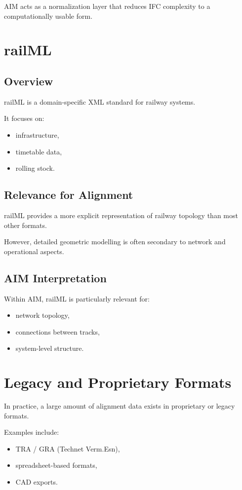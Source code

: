 AIM acts as a normalization layer that reduces IFC complexity to a
computationally usable form.


\section{railML}

\subsection{Overview}

railML is a domain-specific XML standard for railway systems.

It focuses on:
\begin{itemize}
\item infrastructure,
\item timetable data,
\item rolling stock.
\end{itemize}

\subsection{Relevance for Alignment}

railML provides a more explicit representation of railway topology than
most other formats.

However, detailed geometric modelling is often secondary to network and
operational aspects.

\subsection{AIM Interpretation}

Within AIM, railML is particularly relevant for:
\begin{itemize}
\item network topology,
\item connections between tracks,
\item system-level structure.
\end{itemize}


\section{Legacy and Proprietary Formats}

In practice, a large amount of alignment data exists in proprietary or
legacy formats.

Examples include:
\begin{itemize}
\item TRA / GRA (Technet Verm.Esn),
\item spreadsheet-based formats,
\item CAD exports.
\end{itemize}

